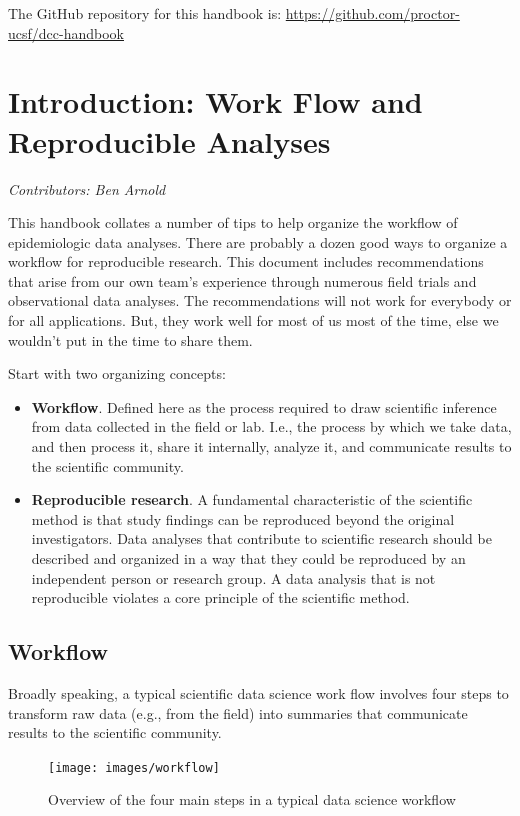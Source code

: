 \documentclass[
]{book}
\begin{document}
The GitHub repository for this handbook is: \url{https://github.com/proctor-ucsf/dcc-handbook}

\chapter{Introduction: Work Flow and Reproducible Analyses}\label{intro}

\emph{Contributors: Ben Arnold}

This handbook collates a number of tips to help organize the workflow of epidemiologic data analyses. There are probably a dozen good ways to organize a workflow for reproducible research. This document includes recommendations that arise from our own team's experience through numerous field trials and observational data analyses. The recommendations will not work for everybody or for all applications. But, they work well for most of us most of the time, else we wouldn't put in the time to share them.

Start with two organizing concepts:

\begin{itemize}
\item
  \textbf{Workflow}. Defined here as the process required to draw scientific inference from data collected in the field or lab. I.e., the process by which we take data, and then process it, share it internally, analyze it, and communicate results to the scientific community.
\item
  \textbf{Reproducible research}. A fundamental characteristic of the scientific method is that study findings can be reproduced beyond the original investigators. Data analyses that contribute to scientific research should be described and organized in a way that they could be reproduced by an independent person or research group. A data analysis that is not reproducible violates a core principle of the scientific method.
\end{itemize}

\section{Workflow}\label{workflow}

Broadly speaking, a typical scientific data science work flow involves four steps to transform raw data (e.g., from the field) into summaries that communicate results to the scientific community.

\begin{figure}
\texttt{[image: images/workflow]} \caption{Overview of the four main steps in a typical data science workflow}\label{fig:fig-workflow}
\end{figure}
\end{document}
